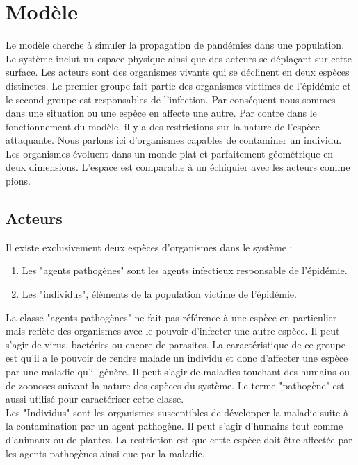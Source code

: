 \chapter{Modèle} \label{ch:modele}

Le modèle cherche à simuler la propagation de pandémies dans une population. Le système inclut un espace physique ainsi que des acteurs se déplaçant sur cette surface. Les acteurs sont des organismes vivants qui se déclinent en deux espèces distinctes. Le premier groupe fait partie des organismes victimes de l'épidémie et le second groupe est responsables de l'infection. Par conséquent nous sommes dans une situation ou une espèce en affecte une autre. Par contre dans le fonctionnement du modèle, il y a des restrictions sur la nature de l'espèce attaquante. Nous parlons ici d'organismes capables de contaminer un individu. \\

Les organismes évoluent dans un monde plat et parfaitement géométrique en deux dimensions. L'espace est comparable à un échiquier avec les acteurs comme pions.

\section{Acteurs}

Il existe exclusivement deux espèces d'organismes dans le système :

\begin{enumerate}
	\item Les "agents pathogènes" sont les agents infectieux responsable de l'épidémie.
	\item Les "individus", éléments de la population victime de l'épidémie.
\end{enumerate}

La classe "agents pathogènes" ne fait pas référence à une espèce en particulier mais reflète des organismes avec le pouvoir d'infecter une autre espèce. Il peut s'agir de virus, bactéries ou encore de parasites. La caractéristique de ce groupe est qu'il a le pouvoir de rendre malade un individu et donc d'affecter une espèce par une maladie qu'il génère. Il peut s'agir de maladies touchant des humains ou de zoonoses suivant la nature des espèces du système. Le terme "pathogène" est aussi utilisé pour caractériser cette classe.\\

Les "Individus" sont les organismes susceptibles de développer la maladie suite à la contamination par un agent pathogène. Il peut s'agir d'humains tout comme d'animaux ou de plantes. La restriction est que cette espèce doit être affectée par les agents pathogènes ainsi que par la maladie.

